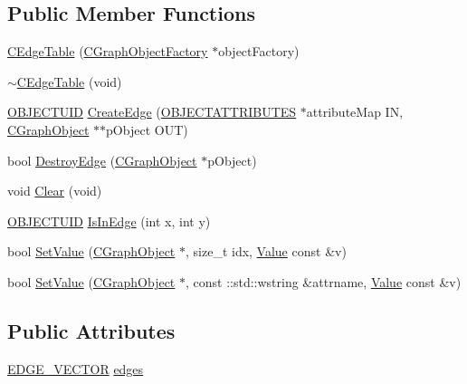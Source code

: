 \subsection*{Public Member Functions}
\begin{DoxyCompactItemize}
\item 
\hyperlink{class_c_edge_table_aa5cf1e4c63c5a83f22b0988ec623eaaa}{C\+Edge\+Table} (\hyperlink{class_c_graph_object_factory}{C\+Graph\+Object\+Factory} $\ast$object\+Factory)
\item 
\hyperlink{class_c_edge_table_a20bb4dc0adfe1c01c333e88fe108cff9}{$\sim$\+C\+Edge\+Table} (void)
\item 
\hyperlink{_object_database_defines_8h_a164ec120b01429b93c9cd0bef2a67e64}{O\+B\+J\+E\+C\+T\+U\+I\+D} \hyperlink{class_c_edge_table_a5f81d14e9af77ec89898f94b404c810e}{Create\+Edge} (\hyperlink{_object_database_defines_8h_a52d1b76b66b20eeaf0c5dc8127da21d7}{O\+B\+J\+E\+C\+T\+A\+T\+T\+R\+I\+B\+U\+T\+E\+S} $\ast$attribute\+Map I\+N, \hyperlink{class_c_graph_object}{C\+Graph\+Object} $\ast$$\ast$p\+Object O\+U\+T)
\item 
bool \hyperlink{class_c_edge_table_a3a94b1b3a08f1ca8af56c51d9bed23d9}{Destroy\+Edge} (\hyperlink{class_c_graph_object}{C\+Graph\+Object} $\ast$p\+Object)
\item 
void \hyperlink{class_c_edge_table_ac40ca4b83c5c3c51aad9f070dbe66ac4}{Clear} (void)
\item 
\hyperlink{_object_database_defines_8h_a164ec120b01429b93c9cd0bef2a67e64}{O\+B\+J\+E\+C\+T\+U\+I\+D} \hyperlink{class_c_edge_table_a4def3b0e6164f83c6550ac07b3a7989f}{Is\+In\+Edge} (int x, int y)
\item 
bool \hyperlink{class_c_edge_table_adc82decff9149b87997cd39552adee74}{Set\+Value} (\hyperlink{class_c_graph_object}{C\+Graph\+Object} $\ast$, size\+\_\+t idx, \hyperlink{class_value}{Value} const \&v)
\item 
bool \hyperlink{class_c_edge_table_a9fbb37293645bad4728f1e234b7ce09f}{Set\+Value} (\hyperlink{class_c_graph_object}{C\+Graph\+Object} $\ast$, const \+::std\+::wstring \&attrname, \hyperlink{class_value}{Value} const \&v)
\end{DoxyCompactItemize}
\subsection*{Public Attributes}
\begin{DoxyCompactItemize}
\item 
\hyperlink{class_c_edge_table_afca2c9fb1e836c43a088a62c6fc369eb}{E\+D\+G\+E\+\_\+\+V\+E\+C\+T\+O\+R} \hyperlink{class_c_edge_table_a77fb8579345ec3d392a72797366d66b9}{edges}
\end{DoxyCompactItemize}
